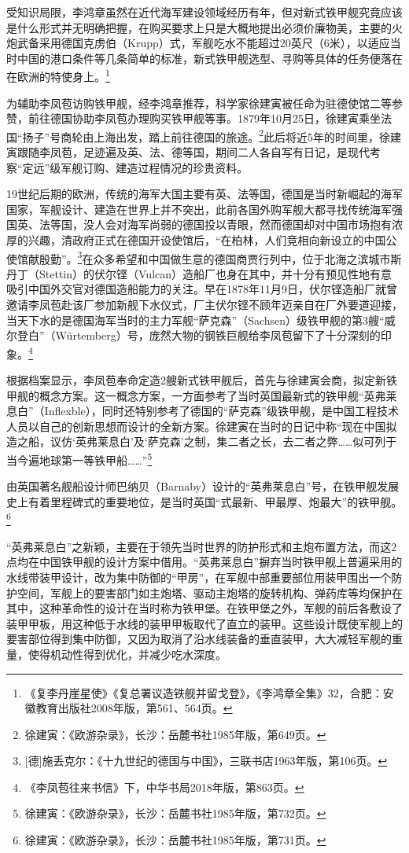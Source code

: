 \documentclass[12pt,UTF8]{ctexbook}
\begin{document}
受知识局限，李鸿章虽然在近代海军建设领域经历有年，但对新式铁甲舰究竟应该是什么形式并无明确把握，在购买要求上只是大概地提出必须价廉物美，主要的火炮武备采用德国克虏伯（Krupp）式，军舰吃水不能超过20英尺（6米），以适应当时中国的港口条件等几条简单的标准，新式铁甲舰选型、寻购等具体的任务便落在在欧洲的特使身上。\footnote{《复李丹崖星使》《复总署议造铁舰并留戈登》，《李鸿章全集》32，合肥：安徽教育出版社2008年版，第561、564页。}

为辅助李凤苞访购铁甲舰，经李鸿章推荐，科学家徐建寅被任命为驻德使馆二等参赞，前往德国协助李凤苞办理购买铁甲舰等事。1879年10月25日，徐建寅乘坐法国“扬子”号商轮由上海出发，踏上前往德国的旅途。\footnote{徐建寅：《欧游杂录》，长沙：岳麓书社1985年版，第649页。}此后将近5年的时间里，徐建寅跟随李凤苞，足迹遍及英、法、德等国，期间二人各自写有日记，是现代考察“定远”级军舰订购、建造过程情况的珍贵资料。

19世纪后期的欧洲，传统的海军大国主要有英、法等国，德国是当时新崛起的海军国家，军舰设计、建造在世界上并不突出，此前各国外购军舰大都寻找传统海军强国英、法等国，没人会对海军尚弱的德国投以青眼，然而德国却对中国市场抱有浓厚的兴趣，清政府正式在德国开设使馆后，“在柏林，人们竞相向新设立的中国公使馆献殷勤”。\footnote{[德]施丢克尔：《十九世纪的德国与中国》，三联书店1963年版，第106页。}在众多希望和中国做生意的德国商贾行列中，位于北海之滨城市斯丹丁（Stettin）的伏尔铿（Vulcan）造船厂也身在其中，并十分有预见性地有意吸引中国外交官对德国造船能力的关注。早在1878年11月9日，伏尔铿造船厂就曾邀请李凤苞赴该厂参加新舰下水仪式，厂主伏尔铿不顾年迈亲自在厂外要道迎接，当天下水的是德国海军当时的主力军舰“萨克森”（Sachsen）级铁甲舰的第3艘“威尔登白”（Würtemberg）号，庞然大物的钢铁巨舰给李凤苞留下了十分深刻的印象。\footnote{《李凤苞往来书信》下，中华书局2018年版，第863页。}

根据档案显示，李凤苞奉命定造2艘新式铁甲舰后，首先与徐建寅会商，拟定新铁甲舰的概念方案。这一概念方案，一方面参考了当时英国最新式的铁甲舰“英弗莱息白”（Inflexble），同时还特别参考了德国的“萨克森”级铁甲舰，是中国工程技术人员以自己的创新思想而设计的全新方案。徐建寅在当时的日记中称“现在中国拟造之船，议仿‘英弗莱息白’及‘萨克森’之制，集二者之长，去二者之弊……似可列于当今遍地球第一等铁甲船……”\footnote{徐建寅：《欧游杂录》，长沙：岳麓书社1985年版，第732页。}

由英国著名舰船设计师巴纳贝（Barnaby）设计的“英弗莱息白”号，在铁甲舰发展史上有着里程碑式的重要地位，是当时英国“式最新、甲最厚、炮最大”的铁甲舰。\footnote{徐建寅：《欧游杂录》，长沙：岳麓书社1985年版，第731页。}

“英弗莱息白”之新颖，主要在于领先当时世界的防护形式和主炮布置方法，而这2点均在中国铁甲舰的设计方案中借用。“英弗莱息白”摒弃当时铁甲舰上普遍采用的水线带装甲设计，改为集中防御的“甲房”，在军舰中部重要部位用装甲围出一个防护空间，军舰上的要害部门如主炮塔、驱动主炮塔的旋转机构、弹药库等均保护在其中，这种革命性的设计在当时称为铁甲堡。在铁甲堡之外，军舰的前后各敷设了装甲甲板，用这种低于水线的装甲甲板取代了直立的装甲。这些设计既使军舰上的要害部位得到集中防御，又因为取消了沿水线装备的垂直装甲，大大减轻军舰的重量，使得机动性得到优化，并减少吃水深度。
\end{document}
